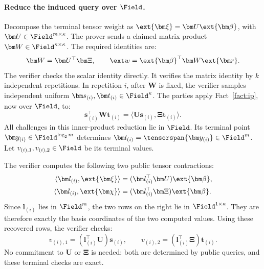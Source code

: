 \paragraph{Reduce the induced query over \(\Field\).}
Decompose the terminal tensor weight as
\(\ext{\bm\xi}=\bm U\ext{\bm\beta}\), with
\(\bm U\in\Field^{m\times\kappa}\).
The prover sends a claimed matrix product
\(\bm W\in\Field^{\kappa\times\kappa}\).
The required identities are:
\begin{equation}
    \bm W=\bm U^\top\bm\Xi,
    \qquad
    \ext w=\ext{\bm\beta}^{\top}\bm W\ext{\bm r}.
\label{eq:pcs-query-matrix}
\end{equation}
The verifier checks the scalar identity directly.
It verifies the matrix identity by \(k\) independent repetitions.
In repetition \(i\), after \(\bm W\) is fixed, the verifier samples
independent uniform
\(\bm s_{(i)},\bm t_{(i)}\in\Field^\kappa\).
The parties apply Fact~\ref{fact:ip}, now over \(\Field\), to:
\begin{equation}
    \bm s_{(i)}^\top\bm W\bm t_{(i)}
    =\langle\bm U\bm s_{(i)},\bm\Xi\bm t_{(i)}\rangle.
\label{eq:pcs-base-projection}
\end{equation}
All challenges in this inner-product reduction lie in \(\Field\).
Its terminal point
\(\bm y_{(i)}\in\Field^{\log_2m}\) determines
\(\bm l_{(i)}=\tensorspan{\bm y_{(i)}}\in\Field^m\).
Let \(v_{(i),1},v_{(i),2}\in\Field\) be its terminal values.

The verifier computes the following two public tensor contractions:
\begin{equation}
\begin{aligned}
    \langle\bm l_{(i)},\ext{\bm\xi}\rangle
       &=(\bm l_{(i)}^\top\bm U)\ext{\bm\beta},\\
    \langle\bm l_{(i)},\ext{\bm\chi}\rangle
       &=(\bm l_{(i)}^\top\bm\Xi)\ext{\bm\beta}.
\end{aligned}
\label{eq:pcs-public-query-evaluation}
\end{equation}
Since \(\bm l_{(i)}\) lies in \(\Field^m\), the two rows on the
right lie in \(\Field^{1\times\kappa}\). They are therefore exactly
the basis coordinates of the two computed values.
Using these recovered rows, the verifier checks:
\begin{equation}
    v_{(i),1}=(\bm l_{(i)}^\top\bm U)\bm s_{(i)},
    \qquad
    v_{(i),2}=(\bm l_{(i)}^\top\bm\Xi)\bm t_{(i)}.
\label{eq:pcs-implicit-query-check}
\end{equation}
No commitment to \(\bm U\) or \(\bm\Xi\) is needed: both are
determined by public queries, and these terminal checks are exact.

